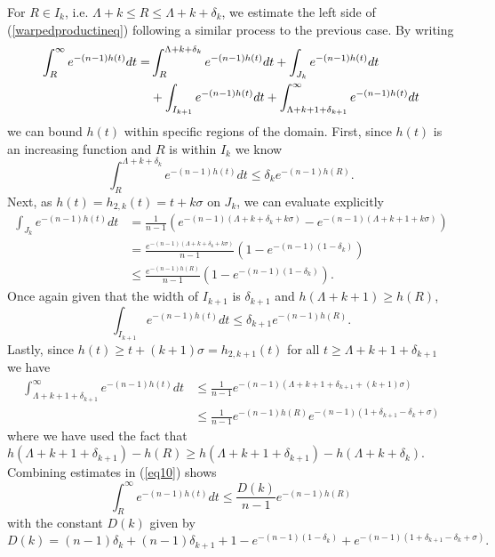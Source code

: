 \documentclass{amsart}
\theoremstyle{definition}
\theoremstyle{remark}
\numberwithin{equation}{section}
\begin{document}
For $R\in I_k$, i.e. $\Lambda + k \leq R \leq \Lambda + k + \delta_k$, we estimate the left side of (\ref{warpedproductineq}) following a similar process to the previous case. By writing
\begin{align}\label{eq10}
\int_R^\infty e^{-(n-1)h(t)}dt = &\int_R^{\Lambda+k+\delta_k}e^{-(n-1)h(t)}dt+\int_{J_k}e^{-(n-1)h(t)}dt\notag \\
&+\int_{I_{k+1}}e^{-(n-1)h(t)}dt+\int_{\Lambda+k+1+\delta_{k+1}}^\infty e^{-(n-1)h(t)}dt
\end{align}
we can bound $h(t)$ within specific regions of the domain. First, since $h(t)$ is an increasing function and $R$ is within $I_k$ we know 
\begin{equation*}
\int_R^{\Lambda+k+\delta_k}e^{-(n-1)h(t)}dt\leq \delta_ke^{-(n-1)h(R)}.
\end{equation*}
Next, as $h(t) = h_{2,k}(t) = t+k\sigma$ on $J_k$, we can evaluate explicitly
\begin{align*}
\int_{J_k}e^{-(n-1)h(t)}dt&=\frac{1}{n-1}\left(e^{-(n-1)(\Lambda +k+\delta_k+k\sigma)}-e^{-(n-1)(\Lambda + k+1+k\sigma  )}\right)\\
&=\frac{e^{-(n-1)(\Lambda+k+\delta_k+k\sigma)}}{n-1}\left(1-e^{-(n-1)(1-\delta_k)}\right)\\
&\leq \frac{e^{-(n-1)h(R)}}{n-1}\left(1-e^{-(n-1)(1-\delta_k)}\right).
\end{align*}
Once again given that the width of $I_{k+1}$ is $\delta_{k+1}$ and $h(\Lambda+k+1)\geq h(R)$,
\begin{equation*}
\int_{I_{k+1}}e^{-(n-1)h(t)}dt\leq \delta_{k+1}e^{-(n-1)h(R)}.
\end{equation*}
Lastly, since $h(t)\geq t+(k+1)\sigma = h_{2,k+1}(t)$ for all $t\geq \Lambda+k+1+\delta_{k+1}$ we have
\begin{align*}
\int_{\Lambda+k+1+\delta_{k+1}}^\infty e^{-(n-1)h(t)}dt &\leq \frac{1}{n-1}e^{-(n-1)(\Lambda+k+1+\delta_{k+1}+(k+1)\sigma)}\\
&\leq \frac{1}{n-1}e^{-(n-1)h(R)}e^{-(n-1)(1+\delta_{k+1}-\delta_k+\sigma)}
\end{align*}
where we have used the fact that $h(\Lambda+k+1+\delta_{k+1}) - h(R)\geq h(\Lambda+k+1+\delta_{k+1}) - h(\Lambda+k+\delta_k)$. Combining estimates in (\ref{eq10}) shows
\begin{equation*}
\int_R^\infty e^{-(n-1)h(t)}dt\leq \frac{D(k)}{n-1}e^{-(n-1)h(R)}
\end{equation*}
with the constant $D(k)$ given by
\begin{equation*}
D(k) = (n-1)\delta_k+(n-1)\delta_{k+1}+1-e^{-(n-1)(1-\delta_k)}+e^{-(n-1)(1+\delta_{k+1}-\delta_k+\sigma)}.
\end{equation*}
\end{document}
